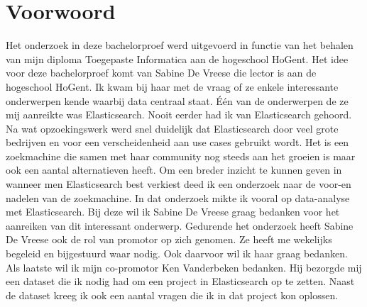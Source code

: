 
\chapter{Voorwoord}
\label{ch:voorwoord}


Het onderzoek in deze bachelorproef werd uitgevoerd in functie van het behalen van mijn diploma Toegepaste Informatica aan de hogeschool HoGent. Het idee voor deze bachelorproef komt van Sabine De Vreese die lector is aan de hogeschool HoGent. Ik kwam bij haar met de vraag of ze enkele interessante onderwerpen kende waarbij data centraal staat. Één van de onderwerpen de ze mij aanreikte was Elasticsearch. Nooit eerder had ik van Elasticsearch gehoord. Na wat opzoekingswerk werd snel duidelijk dat Elasticsearch door veel grote bedrijven en voor een verscheidenheid aan use cases gebruikt wordt. Het is een zoekmachine die samen met haar community nog steeds aan het groeien is maar ook een aantal alternatieven heeft. Om een breder inzicht te kunnen geven in wanneer men Elasticsearch best verkiest deed ik een onderzoek naar de voor-en nadelen van de zoekmachine. In dat onderzoek mikte ik vooral op data-analyse met Elasticsearch. Bij deze wil ik Sabine De Vreese graag bedanken voor het aanreiken van dit interessant onderwerp. Gedurende het onderzoek heeft Sabine De Vreese ook de rol van promotor op zich genomen. Ze heeft me wekelijks begeleid en bijgestuurd waar nodig. Ook daarvoor wil ik haar graag bedanken. Als laatste wil ik mijn co-promotor Ken Vanderbeken bedanken. Hij bezorgde mij een dataset die ik nodig had om een project in Elasticsearch op te zetten. Naast de dataset kreeg ik ook een aantal vragen die ik in dat project kon oplossen.

